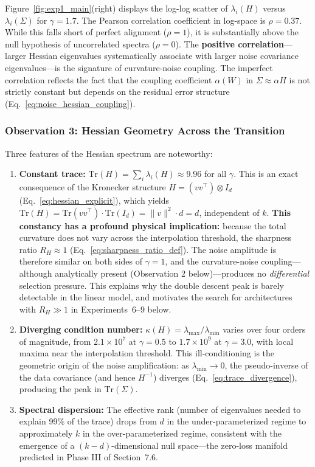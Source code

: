 \documentclass[
  journal=largetwo,
  simfonts=false,
  year=2025,
  volume=37,
]{cup-journal}
\begin{document}
Figure~\ref{fig:exp1_main}(right) displays the log-log scatter of $\lambda_i(H)$ versus $\lambda_i(\Sigma)$ for $\gamma = 1.7$. The Pearson correlation coefficient in log-space is $\rho = 0.37$. While this falls short of perfect alignment ($\rho = 1$), it is substantially above the null hypothesis of uncorrelated spectra ($\rho = 0$). The \textbf{positive correlation}---larger Hessian eigenvalues systematically associate with larger noise covariance eigenvalues---is the signature of curvature-noise coupling. The imperfect correlation reflects the fact that the coupling coefficient $\alpha(W)$ in $\Sigma \approx \alpha H$ is not strictly constant but depends on the residual error structure (Eq.~\ref{eq:noise_hessian_coupling}).

\subsubsection{Observation 3: Hessian Geometry Across the Transition}

Three features of the Hessian spectrum are noteworthy:
\begin{enumerate}
    \item \textbf{Constant trace:} $\mathrm{Tr}(H) = \sum_i \lambda_i(H) \approx 9.96$ for all $\gamma$. This is an exact consequence of the Kronecker structure $H = (vv^\top) \otimes I_d$ (Eq.~\ref{eq:hessian_explicit}), which yields $\mathrm{Tr}(H) = \mathrm{Tr}(vv^\top) \cdot \mathrm{Tr}(I_d) = \|v\|^2 \cdot d = d$, independent of $k$. \textbf{This constancy has a profound physical implication:} because the total curvature does not vary across the interpolation threshold, the sharpness ratio $R_H \approx 1$ (Eq.~\ref{eq:sharpness_ratio_def}). The noise amplitude is therefore similar on both sides of $\gamma = 1$, and the curvature-noise coupling---although analytically present (Observation 2 below)---produces no \textit{differential} selection pressure. This explains why the double descent peak is barely detectable in the linear model, and motivates the search for architectures with $R_H \gg 1$ in Experiments~6--9 below.
    \item \textbf{Diverging condition number:} $\kappa(H) = \lambda_{\max}/\lambda_{\min}$ varies over four orders of magnitude, from $2.1 \times 10^7$ at $\gamma = 0.5$ to $1.7 \times 10^9$ at $\gamma = 3.0$, with local maxima near the interpolation threshold. This ill-conditioning is the geometric origin of the noise amplification: as $\lambda_{\min} \to 0$, the pseudo-inverse of the data covariance (and hence $H^{-1}$) diverges (Eq.~\ref{eq:trace_divergence}), producing the peak in $\mathrm{Tr}(\Sigma)$.
    \item \textbf{Spectral dispersion:} The effective rank (number of eigenvalues needed to explain 99\% of the trace) drops from $d$ in the under-parameterized regime to approximately $k$ in the over-parameterized regime, consistent with the emergence of a $(k-d)$-dimensional null space---the zero-loss manifold predicted in Phase III of Section~7.6.
\end{enumerate}
\end{document}
